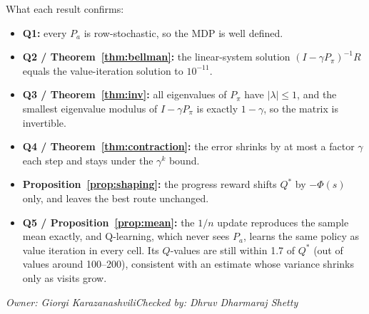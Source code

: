 \documentclass[10pt]{article}
\theoremstyle{definition}
\newcommand{\GK}{Giorgi Karazanashvili}
\newcommand{\DS}{Dhruv Dharmaraj Shetty}
\newcommand{\signoff}[2]{\par\smallskip\hfill\emph{Owner: #1}\qquad\emph{Checked by: #2}\par\medskip}
\begin{document}
\noindent What each result confirms:
\begin{itemize}[nosep]
\item \textbf{Q1:} every $P_a$ is row-stochastic, so the MDP is well defined.
\item \textbf{Q2 / Theorem~\ref{thm:bellman}:} the linear-system solution $(I-\gamma P_\pi)^{-1}R$ equals the value-iteration solution to $10^{-11}$.
\item \textbf{Q3 / Theorem~\ref{thm:inv}:} all eigenvalues of $P_\pi$ have $|\lambda|\le1$, and the smallest eigenvalue modulus of $I-\gamma P_\pi$ is exactly $1-\gamma$, so the matrix is invertible.
\item \textbf{Q4 / Theorem~\ref{thm:contraction}:} the error shrinks by at most a factor $\gamma$ each step and stays under the $\gamma^k$ bound.
\item \textbf{Proposition~\ref{prop:shaping}:} the progress reward shifts $Q^*$ by $-\Phi(s)$ only, and leaves the best route unchanged.
\item \textbf{Q5 / Proposition~\ref{prop:mean}:} the $1/n$ update reproduces the sample mean exactly, and Q-learning, which never sees $P_a$, learns the same policy as value iteration in every cell. Its $Q$-values are still within 1.7 of $Q^*$ (out of values around 100--200), consistent with an estimate whose variance shrinks only as visits grow.
\end{itemize}
\signoff{\GK}{\DS}



\end{document}
